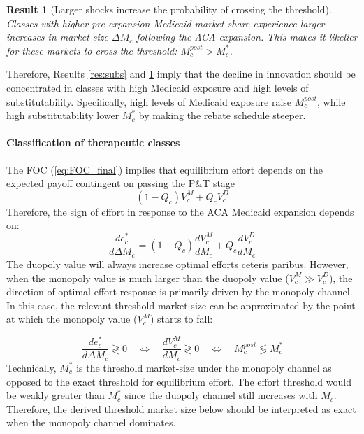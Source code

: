 \documentclass[12pt]{article}
\newtheorem{result}{Result}
\begin{document}
\begin{result}[Larger shocks increase the probability of crossing the threshold] \label{res:shock}
Classes with higher pre-expansion Medicaid market share experience larger increases in market size $\Delta M_c$ following the ACA expansion. This makes it likelier for these markets to cross the threshold: $M_c^{post} > M_c^*$.
\end{result}

Therefore, Results \ref{res:subs} and \ref{res:shock} imply that the decline in innovation should be concentrated in classes with high Medicaid exposure and high levels of substitutability. Specifically, high levels of Medicaid exposure raise $M_c^{post}$, while high substitutability lower $M_c^*$ by making the rebate schedule steeper. 

\paragraph{Classification of therapeutic classes}
The FOC (\ref{eq:FOC_final}) implies that equilibrium effort depends on the expected payoff contingent on passing the P\&T stage
\[
(1-Q_c)V_c^M + Q_c V_c^D 
\]
Therefore, the sign of effort in response to the ACA Medicaid expansion depends on:
\begin{equation} \label{eq:effort_sign_full}
\frac{de^*_c}{d\Delta M_c} = (1-Q_c)\frac{dV_c^M}{dM_c} + Q_c \frac{dV_c^D}{dM_c}
\end{equation}
The duopoly value will always increase optimal efforts ceteris paribus. However, when the monopoly value is much larger than the duopoly value ($V_c^M \gg V_c^D$), the direction of optimal effort response is primarily driven by the monopoly channel. In this case, the relevant threshold market size can be approximated by the point at which the monopoly value ($V_c^M$) starts to fall:

\begin{equation} \label{eq:effort_sign}
    \frac{de_c^*}{d\Delta M_c} \gtrless 0 \quad \Longleftrightarrow \quad \frac{dV_c^M}{dM_c} \gtrless 0 \quad \Longleftrightarrow \quad M_c^{post} \lessgtr M_c^*
\end{equation}
Technically, $M_c^*$ is the threshold market-size under the monopoly channel as opposed to the exact threshold for equilibrium effort. The effort threshold would be weakly greater than $M_c^*$ since the duopoly channel still increases with $M_c$. Therefore, the derived threshold market size below should be interpreted as exact when the monopoly channel dominates.
\end{document}
